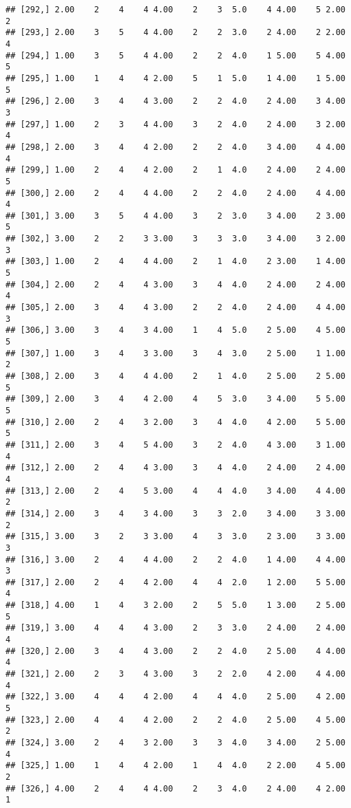 \documentclass[]{article}
\begin{document}
\begin{verbatim}
## [292,] 2.00    2    4    4 4.00    2    3  5.0    4 4.00    5 2.00    2
## [293,] 2.00    3    5    4 4.00    2    2  3.0    2 4.00    2 2.00    4
## [294,] 1.00    3    5    4 4.00    2    2  4.0    1 5.00    5 4.00    5
## [295,] 1.00    1    4    4 2.00    5    1  5.0    1 4.00    1 5.00    5
## [296,] 2.00    3    4    4 3.00    2    2  4.0    2 4.00    3 4.00    3
## [297,] 1.00    2    3    4 4.00    3    2  4.0    2 4.00    3 2.00    4
## [298,] 2.00    3    4    4 2.00    2    2  4.0    3 4.00    4 4.00    4
## [299,] 1.00    2    4    4 2.00    2    1  4.0    2 4.00    2 4.00    5
## [300,] 2.00    2    4    4 4.00    2    2  4.0    2 4.00    4 4.00    4
## [301,] 3.00    3    5    4 4.00    3    2  3.0    3 4.00    2 3.00    5
## [302,] 3.00    2    2    3 3.00    3    3  3.0    3 4.00    3 2.00    3
## [303,] 1.00    2    4    4 4.00    2    1  4.0    2 3.00    1 4.00    5
## [304,] 2.00    2    4    4 3.00    3    4  4.0    2 4.00    2 4.00    4
## [305,] 2.00    3    4    4 3.00    2    2  4.0    2 4.00    4 4.00    3
## [306,] 3.00    3    4    3 4.00    1    4  5.0    2 5.00    4 5.00    5
## [307,] 1.00    3    4    3 3.00    3    4  3.0    2 5.00    1 1.00    2
## [308,] 2.00    3    4    4 4.00    2    1  4.0    2 5.00    2 5.00    5
## [309,] 2.00    3    4    4 2.00    4    5  3.0    3 4.00    5 5.00    5
## [310,] 2.00    2    4    3 2.00    3    4  4.0    4 2.00    5 5.00    5
## [311,] 2.00    3    4    5 4.00    3    2  4.0    4 3.00    3 1.00    4
## [312,] 2.00    2    4    4 3.00    3    4  4.0    2 4.00    2 4.00    4
## [313,] 2.00    2    4    5 3.00    4    4  4.0    3 4.00    4 4.00    2
## [314,] 2.00    3    4    3 4.00    3    3  2.0    3 4.00    3 3.00    2
## [315,] 3.00    3    2    3 3.00    4    3  3.0    2 3.00    3 3.00    3
## [316,] 3.00    2    4    4 4.00    2    2  4.0    1 4.00    4 4.00    3
## [317,] 2.00    2    4    4 2.00    4    4  2.0    1 2.00    5 5.00    4
## [318,] 4.00    1    4    3 2.00    2    5  5.0    1 3.00    2 5.00    5
## [319,] 3.00    4    4    4 3.00    2    3  3.0    2 4.00    2 4.00    4
## [320,] 2.00    3    4    4 3.00    2    2  4.0    2 5.00    4 4.00    4
## [321,] 2.00    2    3    4 3.00    3    2  2.0    4 2.00    4 4.00    4
## [322,] 3.00    4    4    4 2.00    4    4  4.0    2 5.00    4 2.00    5
## [323,] 2.00    4    4    4 2.00    2    2  4.0    2 5.00    4 5.00    2
## [324,] 3.00    2    4    3 2.00    3    3  4.0    3 4.00    2 5.00    4
## [325,] 1.00    1    4    4 2.00    1    4  4.0    2 2.00    4 5.00    2
## [326,] 4.00    2    4    4 4.00    2    3  4.0    2 4.00    4 2.00    1

\end{verbatim}
\end{document}
